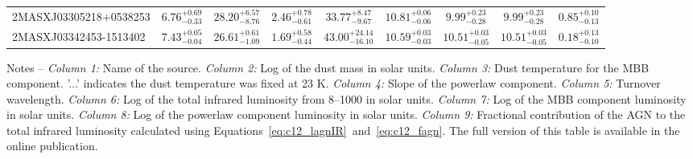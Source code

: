 \documentclass[fleqn, usenatbib]{mnras}
\begin{document}
\begin{table}
\begin{threeparttable}
\begin{tabular}{lcccccccc}
2MASXJ03305218+0538253 & $6.76_{-0.33}^{+0.69}$ & $28.20_{-8.76}^{+6.57}$ & $2.46_{-0.61}^{+0.78}$ &$33.77_{-9.67}^{+8.47}$ & $10.81_{-0.06}^{+0.06}$ & $9.99_{-0.28}^{+0.23}$ & $9.99_{-0.28}^{+0.23}$ & $0.85_{-0.13}^{+0.10}$ \\
2MASXJ03342453-1513402 & $7.43_{-0.04}^{+0.05}$ & $26.61_{-1.09}^{+0.61}$ & $1.69_{-0.44}^{+0.58}$ &$43.00_{-16.10}^{+24.14}$ & $10.59_{-0.03}^{+0.03}$ & $10.51_{-0.05}^{+0.03}$ & $10.51_{-0.05}^{+0.03}$ & $0.18_{-0.10}^{+0.13}$ \\\bottomrule
\end{tabular}
\begin{tablenotes}
\item Notes -- \textit{Column 1:} Name of the source. \textit{Column 2:} Log of the dust mass in solar units. \textit{Column 3:} Dust temperature for the MBB component. '...' indicates the dust temperature was fixed at 23 K. \textit{Column 4:} Slope of the powerlaw component. \textit{Column 5:} Turnover wavelength. \textit{Column 6:} Log of the total infrared luminosity from 8--1000 \micron{} in solar units. \textit{Column 7:} Log of the MBB component luminosity in solar units. \textit{Column 8:} Log of the powerlaw component luminosity in solar units. \textit{Column 9:} Fractional contribution of the AGN to the total infrared luminosity calculated using Equations~\ref{eq:c12_lagnIR}~and~\ref{eq:c12_fagn}. The full version of this table is available in the online publication.
\end{tablenotes}
\end{threeparttable}
\end{table}
\end{document}
